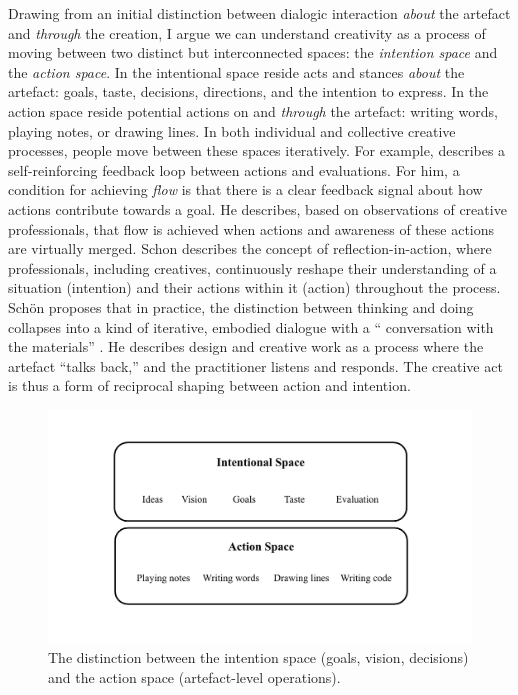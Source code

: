 Drawing from an initial distinction between dialogic interaction\textit{ about} the artefact and \textit{through} the creation, I argue we can understand creativity as a process of moving between two distinct but interconnected spaces: the \textit{intention space} and the \textit{action space}. In the intentional space reside acts and stances \textit{about} the artefact: goals, taste, decisions, directions, and the intention to express. In the action space reside potential actions on and \textit{through} the artefact: writing words, playing notes, or drawing lines. In both individual and collective creative processes, people move between these spaces iteratively. For example, \cite{Csikszentmihalyi1997-ui} describes a self-reinforcing feedback loop between actions and evaluations. For him, a condition for achieving \textit{flow} is that there is a clear feedback signal about how actions contribute towards a goal. He describes, based on observations of creative professionals, that flow is achieved when actions and awareness of these actions are virtually merged. Schon\cite{Schon1987-fy} describes the concept of reflection-in-action, where professionals, including creatives, continuously reshape their understanding of a situation (intention) and their actions within it (action) throughout the process. Schön proposes that in practice, the distinction between thinking and doing collapses into a kind of iterative, embodied dialogue with a “ conversation with the materials” \cite{Schon1992-jt}. He describes design and creative work as a process where the artefact “talks back,” and the practitioner listens and responds. The creative act is thus a form of reciprocal shaping between action and intention.


\begin{figure}[H]
    \centering
    \includegraphics[width=1\linewidth]{intention action spaces.png}
    \caption{The distinction between the intention space (goals, vision, decisions) and the action space (artefact-level operations).}
    \label{fig:intention-action-spaces}
\end{figure}

